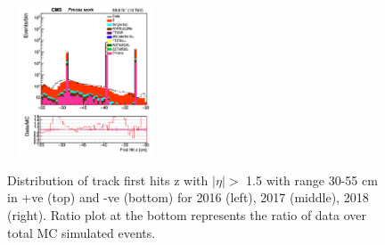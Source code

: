 \documentclass{cernatlasnote}
\begin{document}
\begin{figure}[htp]
 \includegraphics[width=4.6cm, height=4.4cm]{images/emu_channel/2018/18_Plots_for_r_z/track_Track_firstHit_z_TRK_etaGT1p5_z30T55_minus_Log.png}\\

  \caption{Distribution of  track first hits z with $|\eta|>$ 1.5 with range 30-55 cm in +ve (top) and -ve (bottom) for 2016 (left), 2017 (middle), 2018 (right). Ratio plot at the bottom represents the ratio of data over total MC simulated events.}
 \label{fig:L0DATAMC}
  \end{figure}
\end{document}
